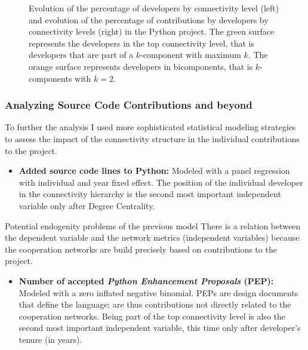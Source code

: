 \documentclass[ignorenonframetext,red,8pt,notes=hide]{beamer}
\begin{document}
\begin{frame}
\begin{figure}
{}
\label{fig:contributions}
\caption[Python: Evolution of connectivity levels and contributions.]{Evolution of the percentage of developers by connectivity level (left) and evolution of the percentage of contributions by developers by connectivity levels (right) in the Python project. The green surface represents the developers in the top connectivity level, that is developers that are part of a $k$-component with maximum $k$. The orange surface represents developers in bicomponents, that is $k$-components with $k=2$.}
\end{figure}

\end{frame}


\begin{frame}
\frametitle{Analyzing Source Code Contributions and beyond}

To further the analysis I used more sophisticated statistical modeling strategies to assess the impact of the connectivity structure in the individual contributions to the project.

\begin{itemize}

\item \textbf{Added source code lines to Python:} Modeled with a panel regression with individual and year fixed effect. The position of the individual developer in the connectivity hierarchy is the second most important independent variable only after Degree Centrality.

\end{itemize}

\pause

\begin{block}{Potential endogenity problems of the previous model}
There is a relation between the dependent variable and the network metrics (independent variables) because the cooperation networks are build precisely based on contributions to the project.
\end{block}

\begin{itemize}

\item \textbf{Number of accepted \textit{Python Enhancement Proposals} (PEP):} Modeled with a zero inflated negative binomial. PEPs are design documents that define the language; are thus contributions not directly related to the cooperation networks. Being part of the top connectivity level is also the second most important independent variable, this time only after developer's tenure (in years).

\end{itemize}


\end{frame}
\end{document}
